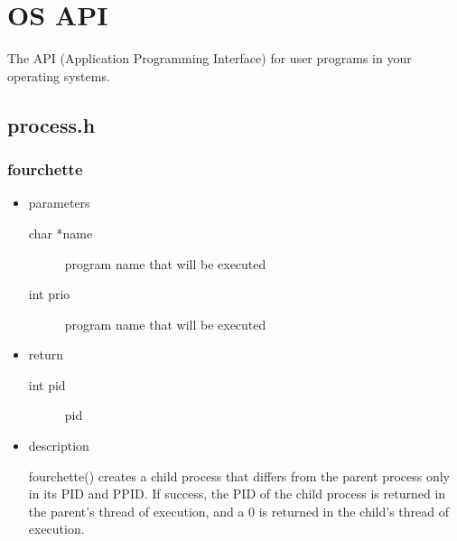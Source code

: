 \chapter{OS API}
The API (Application Programming Interface) for user programs in your operating systems.

\section{process.h}

\subsection{fourchette}
\begin{itemize}
\item{parameters}
\begin{description}
	\item[char *name] program name that will be executed
	\item[int prio] program name that will be executed
\end{description}
\item{return}
\begin{description}
	\item[int pid] pid
\end{description}
\item{description}

fourchette() creates a child process that differs from the parent process only in its PID and PPID.
If success, the PID of the child process is returned in the parent's thread of execution,
and a 0 is returned in the child's thread of execution.
\end{itemize}

